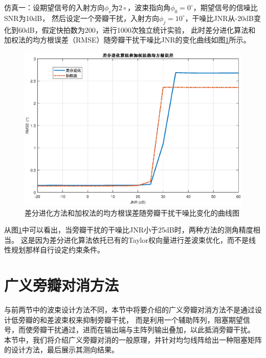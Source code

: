 \documentclass[master]{thesis-uestc}
\begin{document}
仿真一：设期望信号的入射方向$\phi_s$为$2\circ$，波束指向角$\phi_0=0^\circ$，期望信号的信噪比SNR为10dB，
然后设定一个旁瓣干扰，入射方向$\phi_j=10^\circ$，干噪比JNR从-20dB变化到60dB，假定快拍数为200，进行1000次独立统计实验，
此时差分进化算法和加权法的均方根误差（RMSE）随旁瓣干扰干噪比JNR的变化曲线如图\ref{DR_RMSE_JNR}所示。
\begin{figure}[H]
    \includegraphics[scale=0.5]{pic/DE_RMSE_JNR.eps}
    \caption{差分进化方法和加权法的均方根误差随旁瓣干扰干噪比变化的曲线图}
    \label{DR_RMSE_JNR}
\end{figure}

从图\ref{DR_RMSE_JNR}中可以看出，当旁瓣干扰的干噪比JNR小于25dB时，两种方法的测角精度相当。
这是因为差分进化算法依托已有的Taylor权向量进行差波束优化，而不是线性规划那样自行设定约束条件。

\section{广义旁瓣对消方法}
与前两节中的波束设计方法不同，本节中将要介绍的广义旁瓣对消方法不是通过设计低旁瓣的和差波束权来抑制旁瓣干扰，
而是利用一个辅助阵列，阻塞期望信号，而使旁瓣干扰通过，进而在输出端与主阵列输出叠加，以此抵消旁瓣干扰。
本节中，我们将介绍广义旁瓣对消的一般原理，并针对均匀线阵给出一种阻塞矩阵的设计方法，最后展示其测向结果。
\end{document}
